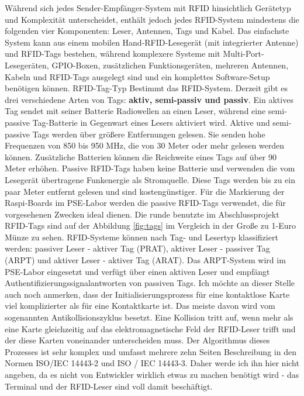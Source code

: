 Während sich jedes Sender-Empfänger-System mit RFID hinsichtlich Gerätetyp und Komplexität unterscheidet, enthält jedoch jedes RFID-System mindestens die folgenden vier Komponenten: Leser, Antennen, Tags und Kabel. Das einfachste System kann aus einem mobilen Hand-RFID-Lesegerät (mit integrierter Antenne) und RFID-Tags bestehen, während komplexere Systeme mit Multi-Port-Lesegeräten, GPIO-Boxen, zusätzlichen Funktionsgeräten, mehreren Antennen, Kabeln und RFID-Tags ausgelegt sind und ein komplettes Software-Setup benötigen können. RFID-Tag-Typ Bestimmt das RFID-System. Derzeit gibt es drei verschiedene Arten von Tags: \textbf{aktiv, semi-passiv und passiv}. Ein aktives Tag sendet mit seiner Batterie Radiowellen an einen Leser, während eine semi-passive Tag-Batterie in Gegenwart eines Lesers aktiviert wird. Aktive und semi-passive Tags werden über größere Entfernungen gelesen. Sie senden hohe Frequenzen von 850 bis 950 MHz, die von 30 Meter oder mehr gelesen werden können. Zusätzliche Batterien können die Reichweite eines Tags auf über 90 Meter erhöhen. Passive RFID-Tags haben keine Batterie und verwenden die vom Lesegerät übertragene Funkenergie als Stromquelle. Diese Tags werden bis zu ein paar Meter entfernt gelesen und sind kostengünstiger\cite{website:13}. Für die Markierung der Raspi-Boards im PSE-Labor werden die passive RFID-Tags verwendet, die für vorgesehenen Zwecken ideal dienen. Die runde benutzte im Abschlussprojekt RFID-Tags sind auf der Abbildung \ref{fig:tags} im Vergleich in der Große zu 1-Euro Münze zu sehen. RFID-Systeme können nach Tag- und Lesertyp klassifiziert werden: passiver Leser - aktiver Tag (PRAT), aktiver Leser - passiver Tag (ARPT) und aktiver Leser - aktiver Tag (ARAT). Das ARPT-System wird im PSE-Labor eingesetzt und verfügt über einen aktiven Leser und empfängt Authentifizierungssignalantworten von passiven Tags. Ich möchte an dieser Stelle auch noch anmerken, dass der Initialisierungsprozess für eine kontaktlose Karte viel komplizierter als für eine Kontaktkarte ist. Das meiste davon wird vom sogenannten Antikollisionszyklus besetzt. Eine Kollision tritt auf, wenn mehr als eine Karte gleichzeitig auf das elektromagnetische Feld der RFID-Leser trifft und der diese Karten voneinander unterscheiden muss. Der Algorithmus dieses Prozesses ist sehr komplex und umfasst mehrere zehn Seiten Beschreibung in den Normen ISO/IEC 14443-2 und ISO / IEC 14443-3. Daher werde ich ihn hier nicht angeben, da es nicht von Entwickler wirklich etwas zu machen benötigt wird - das Terminal und der RFID-Leser sind voll damit beschäftigt.

